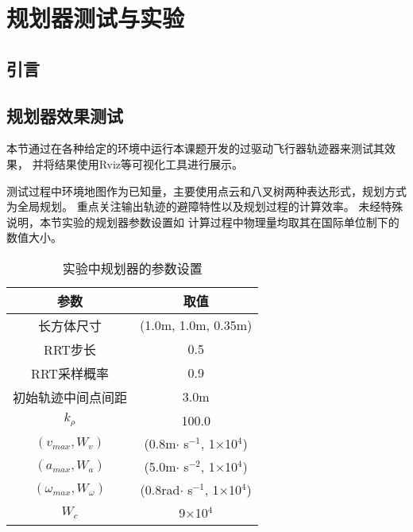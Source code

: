 
\chapter{规划器测试与实验}\label{chap:experiments}

\section{引言}\label{sec:intro_5}

\section{规划器效果测试}\label{sec:planner_performance}

本节通过在各种给定的环境中运行本课题开发的过驱动飞行器轨迹器来测试其效果，
并将结果使用Rviz\cite{kam2015rviz}等可视化工具进行展示。

测试过程中环境地图作为已知量，主要使用点云和八叉树两种表达形式，规划方式为全局规划。
重点关注输出轨迹的避障特性以及规划过程的计算效率。
未经特殊说明，本节实验的规划器参数设置如
计算过程中物理量均取其在国际单位制下的数值大小。

\begin{table}[htbp]
    \caption{实验中规划器的参数设置\label{tab:planner_parameter_setting}}
    \vspace{0.5em}\centering\wuhao
    \begin{tabular}{cc}
    \toprule[1.5pt]
    参数 & 取值\\
    \midrule[1pt]
    长方体尺寸 & (1.0m, 1.0m, 0.35m) \\
    RRT步长 & 0.5 \\ 
    RRT采样概率 & 0.9 \\
    初始轨迹中间点间距 & 3.0m \\
    $k_\rho$ & 100.0 \\
    $(v_{max}, W_v)$ & (0.8m$\cdot$ s$^{-1}$, 1$\times$10$^{4}$) \\
    $(a_{max}, W_a)$ & (5.0m$\cdot$ s$^{-2}$, 1$\times$10$^{4}$) \\
    $(\omega_{max}, W_\omega)$ & (0.8rad$\cdot$ s$^{-1}$, 1$\times$10$^{4}$) \\
    $W_c$ & 9$\times$10$^{4}$ \\
    \bottomrule[1.5pt]
    \end{tabular}
  \end{table}

